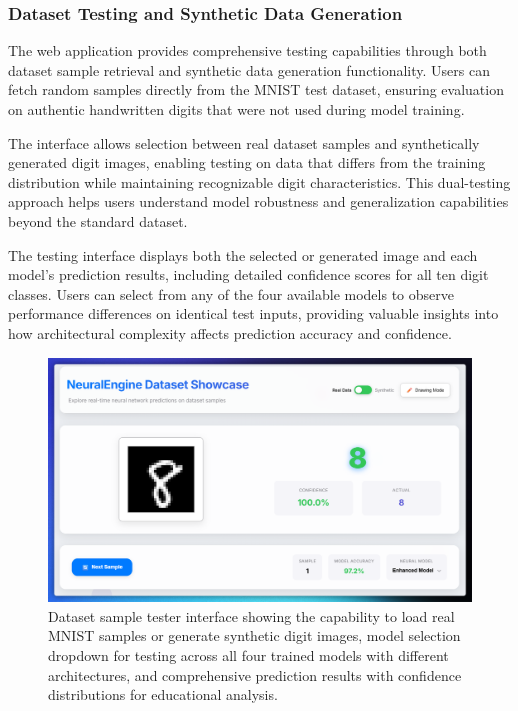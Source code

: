 \documentclass[11pt,a4paper]{report}
\begin{document}
\subsubsection{Dataset Testing and Synthetic Data Generation}

The web application provides comprehensive testing capabilities through both dataset sample retrieval and synthetic data generation functionality. Users can fetch random samples directly from the MNIST test dataset, ensuring evaluation on authentic handwritten digits that were not used during model training.

The interface allows selection between real dataset samples and synthetically generated digit images, enabling testing on data that differs from the training distribution while maintaining recognizable digit characteristics. This dual-testing approach helps users understand model robustness and generalization capabilities beyond the standard dataset.

The testing interface displays both the selected or generated image and each model's prediction results, including detailed confidence scores for all ten digit classes. Users can select from any of the four available models to observe performance differences on identical test inputs, providing valuable insights into how architectural complexity affects prediction accuracy and confidence.

\begin{figure}[H]
\centering
\includegraphics[width=\textwidth]{digit_recognizer_dataset_tester.png}
\caption{Dataset sample tester interface showing the capability to load real MNIST samples or generate synthetic digit images, model selection dropdown for testing across all four trained models with different architectures, and comprehensive prediction results with confidence distributions for educational analysis.}
\label{fig:digit_dataset_tester}
\end{figure}
\end{document}
